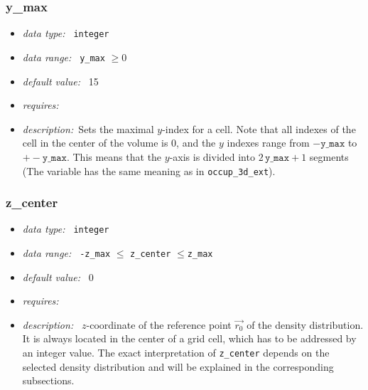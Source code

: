 \documentclass[a4paper,10pt]{article}
\begin{document}
\subsubsection{y\_max}
\label{hydopt:ymax}
\begin{itemize}
 \item \textit{data type:~} \texttt{integer}
 \item \textit{data range:~} \texttt{y\_max} $\ge0$
 \item \textit{default value:~} 15
 \item \textit{requires:~}
 \item \textit{description:~}Sets the maximal $y$-index for a cell. Note that
  all indexes of the cell in the center of the volume is 0, and the  $y$ 
  indexes range from $-\mathtt{y\_max}$ to $+-\mathtt{y\_max}$. This means that 
  the $y$-axis is divided into $2\, \mathtt{y\_max} +1$ segments (The variable 
  has the same meaning as in \texttt{occup\_3d\_ext}).
\end{itemize}

\subsubsection{z\_center}
\label{hydopt:zcenter}
\begin{itemize}
 \item \textit{data type:~} \texttt{integer}
 \item \textit{data range:~} \texttt{-z\_max} $ \leq$ \texttt{z\_center} 
  $\leq $\texttt{z\_max} 
 \item \textit{default value:~} 0
 \item \textit{requires:~} 
 \item \textit{description:~} $z$-coordinate of the reference point $\vec{r_0}$
  of the density distribution.  It is always located in the center of a grid 
  cell, which has to be addressed by an integer value. 
  The exact interpretation of \texttt{z\_center} depends on the selected 
  density distribution and will be 
  explained in the corresponding subsections.
\end{itemize}
\end{document}
